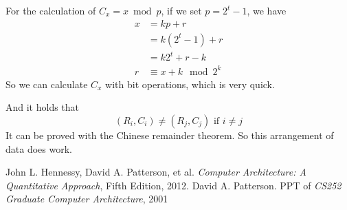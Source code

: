 \documentclass[12pt, a4paper]{article}
\theoremstyle{margin}
\begin{document}
				For the calculation of $C_x = x \bmod p$, if we set $p = 2^t - 1$, we have
				\[\begin{split}
				x &= kp + r \\
					&= k(2^t - 1) + r\\
					&= k2^t + r - k \\
				r &\equiv x + k \mod 2^k
				\end{split}\]
				So we can calculate $C_x$ with bit operations, which is very quick.

				And it holds that
				\[(R_i, C_i) \ne (R_j, C_j)\text{ if } i \ne j\]
				It can be proved with the Chinese remainder theorem. So this arrangement of data does work.




\begin{thebibliography}{9}
	John L. Hennessy, David A. Patterson, et al.
	\emph{Computer Architecture: A Quantitative Approach},
	Fifth Edition, 2012.
	David A. Patterson.
	PPT of \emph{CS252 Graduate Computer Architecture},
	2001
\end{thebibliography}
\end{document}
